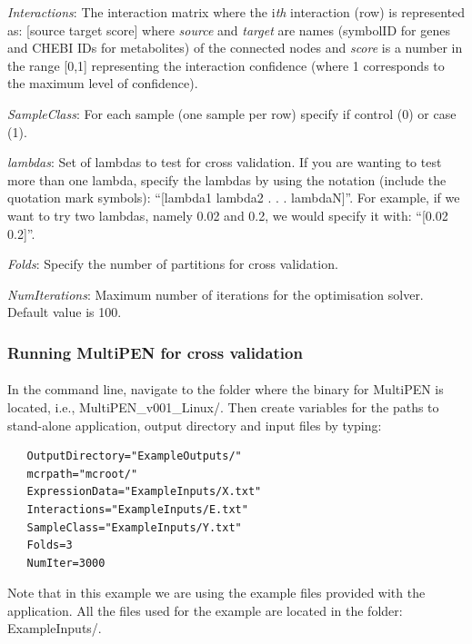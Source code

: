 \documentclass[11pt, oneside]{article}   	%
\begin{document}
{\it Interactions}: The interaction matrix where the i{\it th} interaction (row) is represented as: [source target score] where {\it source} and {\it target} are names (symbolID for genes and CHEBI IDs for metabolites) of the connected nodes and {\it score} is a number in the range [0,1] representing the interaction confidence (where 1 corresponds to the maximum level of confidence).

{\it SampleClass}: For each sample (one sample per row) specify if control (0) or case (1).

{\it lambdas}: Set of lambdas to test for cross validation. If you are wanting to test more than one lambda, specify the lambdas by using the notation (include the quotation mark symbols): ``[lambda1 lambda2 . . . lambdaN]''. For example, if we want to try two lambdas, namely 0.02 and 0.2, we would specify it with: ``[0.02 0.2]''.

{\it Folds}: Specify the number of partitions for cross validation.

{\it NumIterations}: Maximum number of iterations for the optimisation solver. Default value is 100.





\subsubsection{Running MultiPEN for cross validation}
\paragraph{}


In the command line, navigate to the folder where the binary for MultiPEN is located, i.e., MultiPEN\_v001\_Linux/. Then create variables for the paths to stand-alone application, output directory and input files by typing:


\begin{framed}
\begin{verbatim}
   OutputDirectory="ExampleOutputs/"
   mcrpath="mcroot/"
   ExpressionData="ExampleInputs/X.txt"
   Interactions="ExampleInputs/E.txt"
   SampleClass="ExampleInputs/Y.txt"
   Folds=3
   NumIter=3000
\end{verbatim}
\end{framed}


Note that in this example we are using the example files provided with the application. All the files used for the example are located in the folder: ExampleInputs/.
\end{document}
